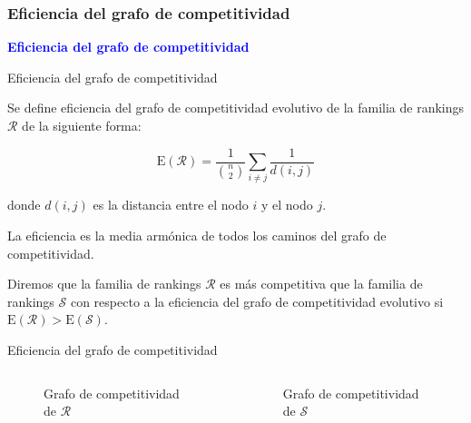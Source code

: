 \documentclass[10pt,hyperref={unicode}]{beamer}
\begin{document}
	\subsubsection{Eficiencia del grafo de competitividad}
	
	\begin{frame}
		\begin{center}
			\Huge\textbf{\textsf{\textcolor{blue}{Eficiencia del grafo de competitividad}}}
		\end{center}
	\end{frame}
	
	\begin{frame}{Eficiencia del grafo de competitividad}
		\begin{defi}
			Se define eficiencia del grafo de competitividad evolutivo de la familia de rankings $\mathcal{R}$ de la siguiente forma:
			
			\begin{equation}
			\mathrm{E}(\mathcal{R}) = \dfrac{1}{\binom{n}{2}} \sum_{i\neq j} \dfrac{1}{d(i,j)}
			\end{equation}
			
			donde $d(i,j)$ es la distancia entre el nodo $i$ y el nodo $j$.
		\end{defi}
		
		La eficiencia es la media armónica de todos los caminos del grafo de competitividad.
		
		\begin{defi}
			Diremos que la familia de rankings $\mathcal{R}$ es más competitiva que la familia de rankings $\mathcal{S}$ con respecto a la eficiencia del grafo de competitividad evolutivo si $\mathrm{E}(\mathcal{R}) > \mathrm{E}(\mathcal{S})$.
		\end{defi}
	\end{frame}
	
	\begin{frame}{Eficiencia del grafo de competitividad}
		\begin{ejemplo}
			\begin{columns}[t] %
				\begin{column}{.50\textwidth}
					\begin{figure}
						\centering
						\resizebox{!}{0.4\textheight}{\ejemplografocompetitividadevolutivo}
						\caption{Grafo de competitividad de $\mathcal{R}$}
					\end{figure}
				\end{column}%
				\hfill%
				\begin{column}{.50\textwidth}
					\begin{figure}
						\centering
						\resizebox{!}{0.4\textheight}{\ejemplofuerzamedia}
						\caption{Grafo de competitividad de $\mathcal{S}$}
					\end{figure}
				\end{column}%
			\end{columns}
		\end{ejemplo}
	\end{frame}
	
\end{document}
